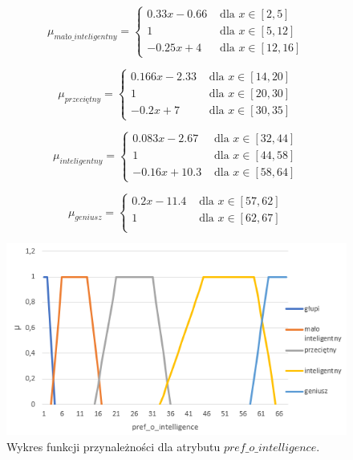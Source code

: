 \documentclass{classrep}
\begin{document}
\begin{enumerate}
  \begin{equation}
    \mu_{mało\_inteligentny} =
      \begin{cases}
        0.33x-0.66 & \text{ dla } x \in [2,5]\\
        1 & \text{ dla } x \in [5,12] \\
        -0.25x+4 & \text{ dla } x \in [12,16]       
      \end{cases}  
  \end{equation}

  \begin{equation}
    \mu_{przeciętny} =
      \begin{cases}
        0.166x-2.33 & \text{ dla } x \in [14,20]\\
        1 & \text{ dla } x \in [20,30] \\
        -0.2x+7 & \text{ dla } x \in [30,35]       
      \end{cases}  
  \end{equation}

  \begin{equation}
    \mu_{inteligentny} =
      \begin{cases}
        0.083x-2.67 & \text{ dla } x \in [32,44]\\
        1 & \text{ dla } x \in [44,58] \\
        -0.16x+10.3 & \text{ dla } x \in [58,64]       
      \end{cases}  
  \end{equation}

  \begin{equation}
    \mu_{geniusz} =
      \begin{cases}
        0.2x-11.4 & \text{ dla } x \in [57,62] \\
        1 & \text{ dla } x \in [62,67] \\   
      \end{cases}  
  \end{equation}
  
  \begin{figure}[H]
    \includegraphics{fp_poi.png}
    \caption{Wykres funkcji przynależności dla atrybutu \(pref\_o\_intelligence\).}
    \end{figure}


\end{enumerate}
\end{document}

